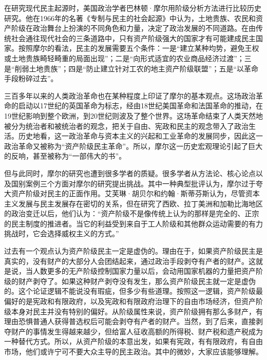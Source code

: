 在研究现代民主起源时，美国政治学者巴林顿·摩尔用阶级分析方法进行比较历史研究。他在1966年的名著《专制与民主的社会起源》中认为，土地贵族、农民和资产阶级在政治舞台上扮演的不同角色和力量，决定了政治发展的不同道路。在由传统社会通往现代社会的三条道路中，只有资产阶级强大的国家才有可能建成民主国家。按照摩尔的看法，民主的发展需要五个条件：一是“建立某种均势，避免王权或土地贵族畸轻畸重的局面出现”；二是“向形式适宜的农业商品经济过渡”；三是“削弱土地贵族”；四是“防止建立针对工农的地主资产阶级联盟”；五是“以革命手段粉碎过去”。

三百多年以来的人类政治革命也在某种程度上印证了摩尔的基本观点。这场政治革命的启动以17世纪的英国革命为标志，经由18世纪美国革命和法国革命的推动，在19世纪影响到整个欧洲，到20世纪则波及了整个世界。这场革命结束了人类天然地被分为统治者和被统治者的观念，把关于自由、宪政和民主的观念带入了政治生活。历史地看，这一政治革命与资本主义的兴起和工业革命的发展同步，因此这一政治革命又被称为“资产阶级民主革命”。所以，摩尔这一历史宏观理论引起了巨大的反响，甚至被称为“一部伟大的书”。

但与此同时，摩尔的研究也遭到很多学者的质疑。很多学者从方法论、核心论点以及国别案例三个方面对摩尔的研究提出挑战。其中一种典型批评认为，摩尔过于夸大资产阶级对民主的正面作用。艾芙琳·胡贝尔和约翰·斯蒂芬斯认为，尽管资本主义发展与民主发展存在密切的关系，但在研究了西欧、拉丁美洲和加勒比海地区的政治变迁以后，他们认为：“资产阶级不是像传统上认为的那样是完全的、正宗的民主制度的推进者。当它的利益受到来自于工人阶级和其他群众运动需要的有力挑战时，它会选择威权主义的方式。”

过去有一个观点认为资产阶级民主一定是虚伪的。理由在于，如果资产阶级民主是真实的，没有财产的大部分人会团结起来，通过政治手段剥夺有产者的财产。这就是说，当人数更多的无产阶级控制国家力量以后，会动用国家机器的力量把资产阶级的财产剥夺了。如果这种财产剥夺没有发生，那么资产阶级民主就一定是虚伪的。这个论证逻辑不能说没有瑕疵，但多少有些道理。按照这一逻辑，资产阶级最偏好的是宪政和有限政府，以及宪政和有限政府治理下的自由市场经济，但资产阶级本身对民主并没有特别的偏好。从阶级属性来说，资产阶级拥有那么多财产，有理由恐惧普通人获得普选权后可能会剥夺有产者的财产。当然，到了后来，直接剥夺财产的事情发生得越来越少，但给富人征收高额的所得税、财产税和遗产税成为一种替代方式。所以，从资产阶级的本意出发，如果有宪政，有有限政府，有自由市场，他们或许宁可不要大众主导的民主政治。其中的微妙，大家应该能够理解。

